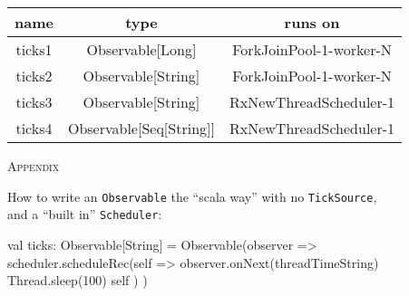 \documentclass[8pt]{beamer}
\newcommand{\codeclass}[1]{\texttt{\textcolor[rgb]{0.4,0.85,0.9375}{#1}}}
\newcommand{\codeobject}[1]{\texttt{\textcolor[rgb]{0.65,0.885,0.18}{#1}}}
\begin{document}
  \begin{center}
    \begin{tabular}{ | c | c | c | }
      \hline
      name & type & runs on \\ \hline
      ticks1 & Observable[Long] & ForkJoinPool-1-worker-N \\ \hline
      ticks2 & Observable[String] & ForkJoinPool-1-worker-N \\ \hline
      ticks3 & Observable[String] & RxNewThreadScheduler-1 \\ \hline
      ticks4 & Observable[Seq[String]] & RxNewThreadScheduler-1 \\ \hline
    \end{tabular}
  \end{center}
  \newpage
  
  \begin{center}
    \textsc{\huge{Appendix}}
  \end{center}  
  
  How to write an \codeclass{Observable} the ``scala way'' with no \codeobject{TickSource},\\
  and a ``built in'' \codeclass{Scheduler}:
  \begin{scalacode}
val ticks: Observable[String] = Observable(observer => {
  scheduler.scheduleRec(self => {
    observer.onNext(threadTimeString)
    Thread.sleep(100)
    self
  })
})
  \end{scalacode}
  \smallskip
\end{document}
